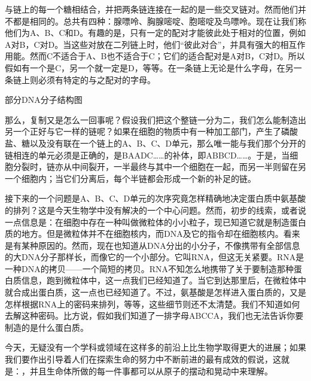 \documentclass[11pt,oneside]{book}
\begin{document}
\begin{common-format}
与链上的每一个糖相结合，并把两条链连接在一起的是一些交叉链对。然而他们并不都是相同的。总共有四种：腺嘌呤、胸腺嘧啶、胞嘧啶及鸟嘌呤。现在让我们称他们为A、B、C和D。有趣的是，只有一定的配对才能彼此处于相对的位置，例如A对B，C对D。当这些对放在二列链上时，他们“彼此对合”，并具有强大的相互作用能。然而C不适合于A、B也不适合于C；它们的适合配对是A对B，C对D。所以假如有一个是C，另一个就一定是D，等等。在一条链上无论是什么字母，在另一条链上则必须有特定的与之配对的字母。

\begin{multicols}{2}
\setlength{\columnseprule}{0.4pt}
\begin{linefig}[0.98]{部分DNA分子结构图}
\label{fig:部分DNA分子结构图}
\end{linefig}
\columnbreak
那么，复制又是怎么一回事呢？假设我们把这个整链一分为二，我们怎么能制造出另一个正好与它一样的链呢？如果在细胞的物质中有一种加工部门，产生了磷酸盐、糖以及没有联在一个链上的A、B、C、D单元，那么唯一能与我们那个分开的链相连的单元必须是正确的，是BAADC……的补体，即ABBCD……。于是，当细胞分裂时，链亦从中间裂开，一半最终与其中一个细胞在一起，而另一半则留在另一个细胞内；当它们分离后，每个半链都会形成一个新的补足的链。
\end{multicols}

接下来的一个问题是A、B、C、D单元的次序究竟怎样精确地决定蛋白质中氨基酸的排列？这是今天生物学中没有解决的一个中心问题。然而，初步的线索，或者说一点信息是：在细胞中存在一种叫做微粒体的小小粒子，现已知道它就是制造蛋白质的地方。但是微粒体并不在细胞核内，而DNA及它的指令却在细胞核内。看来是有某种原因的。然而，现在也知道从DNA分出的小分子，不像携带有全部信息的大DNA分子那样长，而像它的一个小部分。它叫RNA，但这无关紧要。RNA是一种DNA的拷贝——一个简短的拷贝。RNA不知怎么地携带了关于要制造那种蛋白质信息，跑到微粒体中，这一点我们已经知道了。当它到达那里后，在微粒体中就合成出蛋白质，这一点也已经知道了。不过，氨基酸是怎样进入蛋白质的，又是怎样根据RNA上的密码来排列，等等，这些细节则还不太清楚。我们不知道如何去解这种密码。比方说，假如我们知道了一排字母ABCCA，我们也无法告诉你要制造的是什么蛋白质。

今天，无疑没有一个学科或领域在这样多的前沿上比生物学取得更大的进展；如果我们要作出引导着人们在探索生命的努力中不断前进的最有成效的假说，这就是：，并且生命体所做的每一件事都可以从原子的摆动和晃动中来理解。



\end{common-format}
\end{document}
